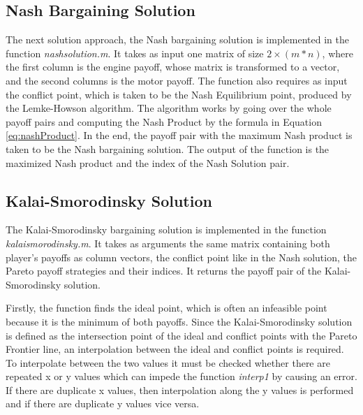 \subsection{Nash Bargaining Solution}
The next solution approach, the Nash bargaining solution is implemented in the function \textit{nashsolution.m}. It takes as input one matrix of size $2 \times (m*n)$, where the first column is the engine payoff, whose matrix is transformed to a vector, and the second columns is the motor payoff. The function also requires as input the conflict point, which is taken to be the Nash Equilibrium point, produced by the Lemke-Howson algorithm. The algorithm works by going over the whole payoff pairs and computing the Nash Product by the formula in Equation \ref{eq:nashProduct}. In the end, the payoff pair with the maximum Nash product is taken to be the Nash bargaining solution. The output of the function is the maximized Nash product and the index of the Nash Solution pair.

\subsection{Kalai-Smorodinsky Solution}
The Kalai-Smorodinsky bargaining solution is implemented in the function \textit{kalaismorodinsky.m}. It takes as arguments the same matrix containing both player's payoffs as column vectors, the conflict point like in the Nash solution, the Pareto payoff strategies and their indices. It returns the payoff pair of the Kalai-Smorodinsky solution.

Firstly, the function finds the ideal point, which is often an infeasible point because it is the minimum of both payoffs. Since the Kalai-Smorodinsky solution is defined as the intersection point of the ideal and conflict points with the Pareto Frontier line, an interpolation between the ideal and conflict points is required. To interpolate between the two values it must be checked whether there are repeated x or y values which can impede the function \textit{interp1} by causing an error. If there are duplicate x values, then interpolation along the y values is performed and if there are duplicate y values vice versa. 

